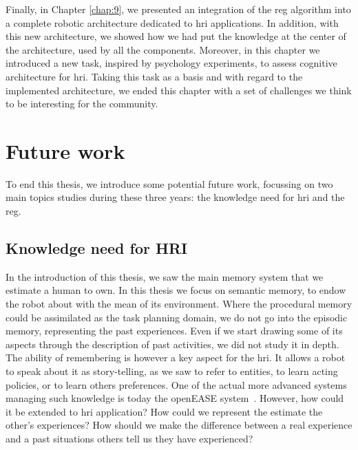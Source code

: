 Finally, in Chapter \ref{chap:9}, we presented an integration of the \acrshort{reg} algorithm into a complete robotic architecture dedicated to \acrshort{hri} applications. In addition, with this new architecture, we showed how we had put the knowledge at the center of the architecture, used by all the components. Moreover, in this chapter we introduced a new task, inspired by psychology experiments, to assess cognitive architecture for \acrshort{hri}. Taking this task as a basis and with regard to the implemented architecture, we ended this chapter with a set of challenges we think to be interesting for the community.

\section*{Future work}

To end this thesis, we introduce some potential future work, focussing on two main topics studies during these three years: the knowledge need for \acrshort{hri} and the \acrshort{reg}.

\subsection*{Knowledge need for HRI}

In the introduction of this thesis, we saw the main memory system that we estimate a human to own. In this thesis we focus on semantic memory, to endow the robot about with the mean of its environment. Where the procedural memory could be assimilated as the task planning domain, we do not go into the episodic memory, representing the past experiences. Even if we start drawing some of its aspects through the description of past activities, we did not study it in depth. The ability of remembering is however a key aspect for the \acrshort{hri}. It allows a robot to speak about it as story-telling, as we saw to refer to entities, to learn acting policies, or to learn others preferences. One of the actual more advanced systems managing such knowledge is today the openEASE system~\cite{beetz_2015_open}. However, how could it be extended to \acrshort{hri} application? How could we represent the estimate the other's experiences? How should we make the difference between a real experience and a past situations others tell us they have experienced?

